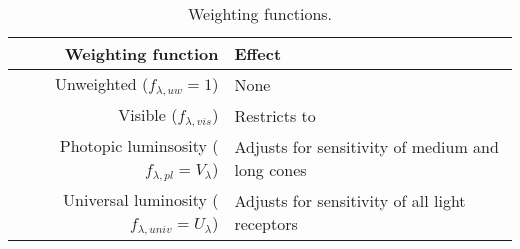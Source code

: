 

\begin{table}
\centering %
\caption{Weighting functions.}
\begin{tabular}{r l}
  \toprule
  Weighting function & Effect \\
  \midrule
  Unweighted ($f_{\lambda,uw} = 1$)  & None \\
  Visible ($f_{\lambda,vis}$) & Restricts to \humaneyesensitivity{} \\
  Photopic luminsosity ($f_{\lambda,pl} = V_\lambda$) \cite{CVRL2008} & Adjusts for sensitivity of medium and long cones \\
  Universal luminosity ($f_{\lambda,univ} = U_\lambda$) \cite{Rea2018} & Adjusts for sensitivity of all light receptors \\
  \bottomrule
\end{tabular}
\label{tab:wfs}
\end{table}

